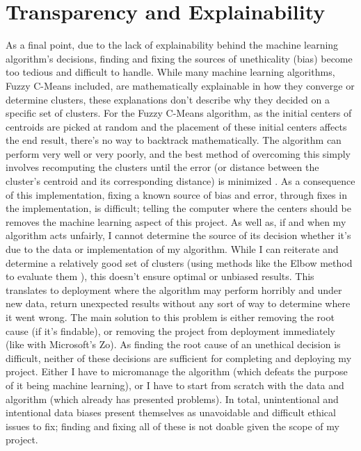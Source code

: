 \documentclass[10pt,twocolumn]{article}
\begin{document}
\section {Transparency and Explainability}

As a final point, due to the lack of explainability behind the machine learning algorithm’s decisions, finding and fixing the sources of unethicality (bias) become too tedious and difficult to handle. While many machine learning algorithms, Fuzzy C-Means included, are mathematically explainable in how they converge or determine clusters, these explanations don’t describe why they decided on a specific set of clusters. For the Fuzzy C-Means algorithm, as the initial centers of centroids are picked at random and the placement of these initial centers affects the end result, there’s no way to backtrack mathematically. The algorithm can perform very well or very poorly, and the best method of overcoming this simply involves recomputing the clusters until the error (or distance between the cluster’s centroid and its corresponding distance) is minimized \cite{GeeksForGeeks2019}. As a consequence of this implementation, fixing a known source of bias and error, through fixes in the implementation, is difficult; telling the computer where the centers should be removes the machine learning aspect of this project. As well as, if and when my algorithm acts unfairly, I cannot determine the source of its decision whether it’s due to the data or implementation of my algorithm. While I can reiterate and determine a relatively good set of clusters (using methods like the Elbow method to evaluate them \cite{PrasadClustering}), this doesn’t ensure optimal or unbiased results. This translates to deployment where the algorithm may perform horribly and under new data, return unexpected results without any sort of way to determine where it went wrong. The main solution to this problem is either removing the root cause (if it’s findable), or removing the project from deployment immediately (like with Microsoft’s Zo). As finding the root cause of an unethical decision is difficult, neither of these decisions are sufficient for completing and deploying my project. Either I have to micromanage the algorithm (which defeats the purpose of it being machine learning), or I have to start from scratch with the data and algorithm (which already has presented problems). In total, unintentional and intentional data biases present themselves as unavoidable and difficult ethical issues to fix; finding and fixing all of these is not doable given the scope of my project.


\printbibliography
 
\end{document}
